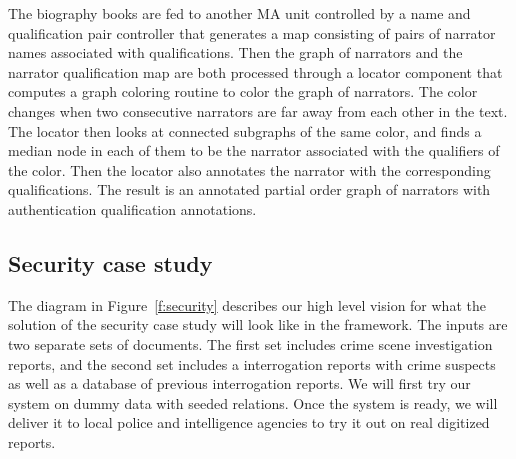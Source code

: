 \documentclass[12pt]{article}
\begin{document}
The biography books are fed to another MA unit controlled by 
a name and qualification pair controller that generates a 
map consisting of pairs of narrator names associated with 
qualifications. 
Then the graph of narrators and the narrator qualification map
are both processed through a locator component that computes
a graph coloring routine to color the graph of narrators. 
The color changes when two consecutive narrators are far away
from each other in the text. 
The locator then looks at connected subgraphs of the same color,
and finds a median node in each of them to be the narrator 
associated with the qualifiers of the color. 
Then the locator also annotates the narrator with the 
corresponding qualifications. 
The result is an annotated partial order graph of narrators
with authentication qualification annotations. 

\subsection{Security case study}
\label{s:design:sec}

\begin{figure}
\end{figure}


The diagram in Figure~\ref{f:security} describes our 
high level vision for what the solution of the 
security case study
will look like in the framework. 
The inputs are two separate sets of documents. 
The first set includes crime scene investigation reports, 
and the second set includes a 
interrogation reports with crime suspects as well as 
a database of previous interrogation reports. 
We will first try our system on dummy data with seeded relations.
Once the system is ready, we will deliver it to local police
and intelligence agencies to try it out on real digitized 
reports. 
\end{document}
